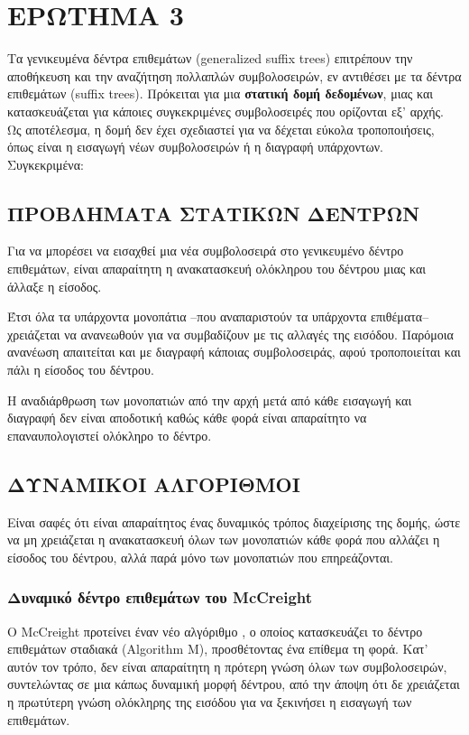 \chapter{ΕΡΩΤΗΜΑ 3}

    Τα γενικευμένα δέντρα επιθεμάτων (generalized suffix trees) επιτρέπουν την αποθήκευση και την αναζήτηση πολλαπλών συμβολοσειρών, εν αντιθέσει με τα δέντρα επιθεμάτων (suffix trees).
    Πρόκειται για μια \textbf{στατική δομή δεδομένων}, μιας και κατασκευάζεται για κάποιες συγκεκριμένες συμβολοσειρές που ορίζονται εξ' αρχής.
    Ως αποτέλεσμα, η δομή δεν έχει σχεδιαστεί για να δέχεται εύκολα τροποποιήσεις, όπως είναι η εισαγωγή νέων συμβολοσειρών ή η διαγραφή υπάρχοντων. Συγκεκριμένα:

    \section{ΠΡΟΒΛΗΜΑΤΑ ΣΤΑΤΙΚΩΝ ΔΕΝΤΡΩΝ}
        Για να μπορέσει να εισαχθεί μια νέα συμβολοσειρά στο γενικευμένο δέντρο επιθεμάτων, είναι απαραίτητη η ανακατασκευή ολόκληρου του δέντρου μιας και άλλαξε η είσοδος.

        Έτσι όλα τα υπάρχοντα μονοπάτια --που αναπαριστούν τα υπάρχοντα επιθέματα-- χρειάζεται να ανανεωθούν για να συμβαδίζουν με τις αλλαγές της εισόδου.
        Παρόμοια ανανέωση απαιτείται και με διαγραφή κάποιας συμβολοσειράς, αφού τροποποιείται και πάλι η είσοδος του δέντρου.

        Η αναδιάρθρωση των μονοπατιών από την αρχή μετά από κάθε εισαγωγή και διαγραφή δεν είναι αποδοτική καθώς κάθε φορά είναι απαραίτητο να επαναυπολογιστεί ολόκληρο το δέντρο.

    \section{ΔΥΝΑΜΙΚΟΙ ΑΛΓΟΡΙΘΜΟΙ}
        Είναι σαφές ότι είναι απαραίτητος ένας δυναμικός τρόπος διαχείρισης της δομής, ώστε να μη χρειάζεται η ανακατασκευή όλων των μονοπατιών κάθε φορά που αλλάζει η είσοδος του δέντρου, αλλά παρά μόνο των μονοπατιών που επηρεάζονται.

        \subsection{Δυναμικό δέντρο επιθεμάτων του McCreight}
            Ο McCreight προτείνει έναν νέο αλγόριθμο \cite{McCreight_1976}, ο οποίος κατασκευάζει το δέντρο επιθεμάτων σταδιακά (Algorithm M), προσθέτοντας ένα επίθεμα τη φορά.
            Κατ' αυτόν τον τρόπο, δεν είναι απαραίτητη η πρότερη γνώση όλων των συμβολοσειρών, συντελώντας σε μια κάπως δυναμική μορφή δέντρου, από την άποψη ότι δε χρειάζεται η πρωτύτερη γνώση ολόκληρης της εισόδου για να ξεκινήσει η εισαγωγή των επιθεμάτων.

